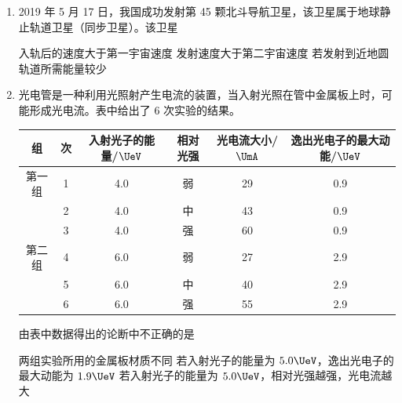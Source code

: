 \documentclass[\gkver]{gaokaozhenti}
\begin{document}
\begin{enumerate}
\item
2019 年 5 月 17 日，我国成功发射第 45 颗北斗导航卫星，该卫星属于地球静止轨道卫星（同步卫星）。该卫星

{入轨后的速度大于第一宇宙速度}
{发射速度大于第二宇宙速度}
{若发射到近地圆轨道所需能量较少}


\item
光电管是一种利用光照射产生电流的装置，当入射光照在管中金属板上时，可能形成光电流。表中给出了 6 次实验的结果。

\begin{center}
\small
\setlength{\tabcolsep}{4pt}
\begin{tabular}{|c|c|c|c|c|c|}
\hline
组 & 次 & 入射光子的能量/$\UeV$ & 相对光强 & 光电流大小/$\UmA$ & 逸出光电子的最大动能/$\UeV$ \\
\hline
第一组 & 1 & 4.0 & 弱 & 29 & 0.9 \\
\hline
 & 2 & 4.0 & 中 & 43 & 0.9 \\
\hline
 & 3 & 4.0 & 强 & 60 & 0.9 \\
\hline
第二组 & 4 & 6.0 & 弱 & 27 & 2.9 \\
\hline
 & 5 & 6.0 & 中 & 40 & 2.9 \\
\hline
 & 6 & 6.0 & 强 & 55 & 2.9 \\
\hline
\end{tabular}
\end{center}

由表中数据得出的论断中不正确的是

{两组实验所用的金属板材质不同}
{若入射光子的能量为 $5.0\UeV$，逸出光电子的最大动能为 $1.9\UeV$}
{若入射光子的能量为 $5.0\UeV$，相对光强越强，光电流越大}


\end{enumerate}
\end{document}

